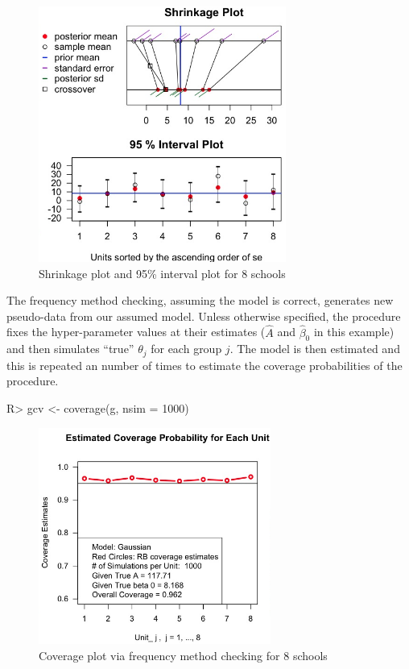 \documentclass[article]{jss}
\begin{document}
\begin{figure}[h] 
\begin{center}
\includegraphics[width = 3.2in]{school1.png}
\caption{Shrinkage plot and 95\% interval plot for 8 schools}
\label{fig:8schoolsplot}
\end{center}
\end{figure}


The frequency method checking, assuming the model is correct, generates new pseudo-data from our assumed model. Unless otherwise specified, the procedure fixes the hyper-parameter values at their estimates ($\hat{A}$ and $\hat{\beta}_0$ in this example) and then simulates ``true'' $\theta_j$ for each group $j$. The model is then estimated and this is repeated an  number of times to estimate the coverage probabilities of the procedure.  

\begin{CodeChunk}
\begin{CodeInput}
R> gcv <- coverage(g, nsim = 1000)
\end{CodeInput}
\end{CodeChunk}
\begin{figure}[h] 
\begin{center}
\includegraphics[width = 3in]{school2.png}
\caption{Coverage plot via frequency method checking for 8 schools}
\label{fig:schoolcoverage}
\end{center}
\end{figure}
\end{document}
